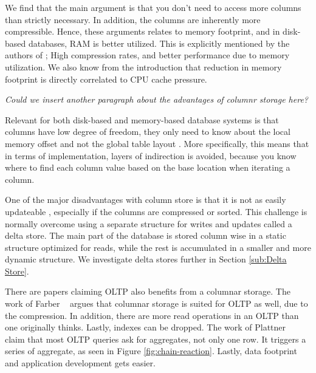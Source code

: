 We find that the main argument is that you don't need to access more columns than strictly necessary. In addition, the columns are inherently more compressible. Hence, these arguments relates to memory footprint, and in disk-based databases, RAM is better utilized. This is explicitly mentioned by the authors of \mssql; High compression rates, and better performance due to memory utilization. We also know from the introduction that reduction in memory footprint is directly correlated to CPU cache pressure. 

\textit{Could we insert another paragraph about the advantages of columnr storage here?}


Relevant for both disk-based and memory-based database systems is that columns have low degree of freedom, they only need to know about the local memory offset and not the global table layout \cite{Boncz2005-wj}. More specifically, this means that in terms of implementation, layers of indirection is avoided, because you know where to find each column value based on the base location when iterating a column. 

One of the major disadvantages with column store is that it is not as easily updateable \cite{Bjorklund2011-wh}, especially if the columns are compressed or sorted. This challenge is normally overcome using a separate structure for writes and updates called a delta store. The main part of the database is stored column wise in a static structure optimized for reads, while the rest is accumulated in a smaller and more dynamic structure. We investigate delta stores further in Section \ref{sub:Delta Store}.

There are papers claiming OLTP also benefits from a columnar storage. The work of Farber \ea~\cite{Farber2012-vh} argues that columnar storage is suited for OLTP as well, due to the compression. In addition, there are more read operations in an OLTP than one originally thinks. Lastly, indexes can be dropped. The work of Plattner \ea~\cite{Plattner2014-fr} claim that most OLTP queries ask for aggregates, not only one row. It triggers a series of aggregate, as seen in Figure \ref{fig:chain-reaction}. Lastly, data footprint and application development gets easier.

